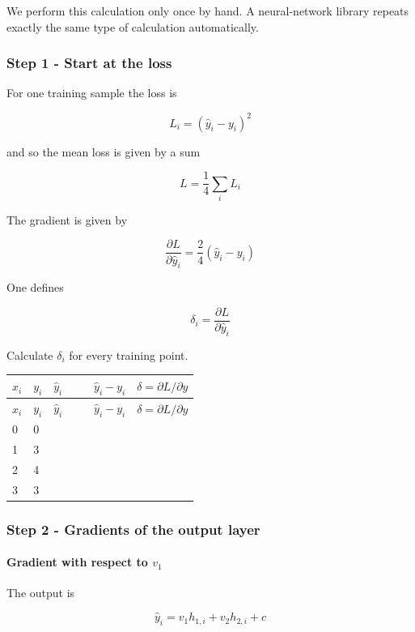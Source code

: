 \documentclass[10pt]{article}
\begin{document}
We perform this calculation only once by hand. A neural-network library repeats exactly the same type of calculation automatically.

\subsubsection*{Step 1 - Start at the loss}
For one training sample the loss is

\[
L_i=(\hat y_i-y_i)^2
\]

and so the mean loss is given by a sum

\[
L=\frac{1}{4}\sum_i L_i
\]

The gradient is given by

\[
\frac{\partial L}{\partial \hat y_i}=\frac{2}{4}(\hat y_i-y_i)
\]

One defines

\[
\delta_i=\frac{\partial L}{\partial \hat y_i}
\]

Calculate $\delta_i$ for every training point.

\begingroup
\small
\setlength{\tabcolsep}{4pt}
\begin{longtable}{l|l|l|l|l}
$x_i$ & $y_i$ & $\hat y_i$ & $\hat y_i-y_i$ & $\delta=\partial L/\partial\hat y$ \\[1.5pt]
\hline
\endfirsthead
$x_i$ & $y_i$ & $\hat y_i$ & $\hat y_i-y_i$ & $\delta=\partial L/\partial\hat y$ \\[1.5pt]
\hline
\endhead
\rule{0pt}{2.4ex}0 & 0 &  $\phantom{-0.00}$ &  $\phantom{-0.00}$ &  $\phantom{-0.00}$ \\[3pt]
\rule{0pt}{2.4ex}1 & 3 &  $\phantom{-0.00}$ &  $\phantom{-0.00}$ &  $\phantom{-0.00}$ \\[3pt]
\rule{0pt}{2.4ex}2 & 4 &  $\phantom{-0.00}$ &  $\phantom{-0.00}$ &  $\phantom{-0.00}$ \\[3pt]
\rule{0pt}{2.4ex}3 & 3 &  $\phantom{-0.00}$ &  $\phantom{-0.00}$ &  $\phantom{-0.00}$ \\[3pt]
\end{longtable}
\endgroup
\subsubsection*{Step 2 - Gradients of the output layer}
\paragraph*{Gradient with respect to $v_1$}
The output is

\[
\hat y_i=v_1h_{1,i}+v_2h_{2,i}+c
\]
\end{document}
